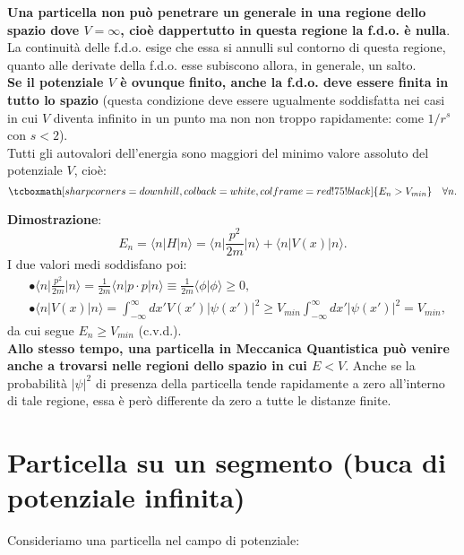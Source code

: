 \documentclass[a4paper,12pt,oneside]{book}
\begin{document}
\textbf{Una particella non può penetrare un generale in una regione dello spazio dove $V =\infty$, cioè dappertutto in questa regione la f.d.o. è nulla}. La continuità delle f.d.o. esige che essa si annulli sul contorno di questa regione, quanto alle derivate della f.d.o. esse subiscono allora, in generale, un salto.\\

\textbf{Se il potenziale $V$ è ovunque finito, anche la f.d.o. deve essere finita in tutto lo spazio} (questa condizione deve essere ugualmente soddisfatta nei casi in cui $V$ diventa infinito in un punto ma non non troppo rapidamente: come $1/r^s$ con $s<2$).\\

Tutti gli autovalori dell'energia sono maggiori del minimo valore assoluto del potenziale $V$, cioè:
	\begin{equation}
		\tcboxmath[sharp corners=downhill, colback=white, colframe=red!75!black]{
			E_n >V_{min} 
			}\quad \forall n.
	\end{equation}
	
\textbf{Dimostrazione}:
	\begin{equation}
		E_n = \langle n \vert H \vert n \rangle =  \langle n \vert \frac{p ^2}{2m} \vert n \rangle + \langle n \vert V(x) \vert n \rangle .
	\end{equation}
I due  valori medi soddisfano poi:
	\begin{align}
		&\bullet \langle n \vert \frac{p ^2}{2m} \vert n \rangle =\frac{1}{2m} \langle n \vert p\cdot p\vert n \rangle \equiv \frac{1}{2m} \langle \phi \vert  \phi \rangle \ge 0 , \\[0.3cm]
		&\bullet \langle n \vert V(x) \vert n \rangle = \int _{-\infty} ^{\infty} dx' V(x') \vert \psi (x') \vert ^2 \geq V_{min} \int _{-\infty} ^{\infty} dx'  \vert \psi (x') \vert ^2 = V_{min} , 
	\end{align}
da cui segue $E_n \geq V_{min}$ (c.v.d.).\\

\textbf{Allo stesso tempo, una particella in Meccanica Quantistica può venire anche a trovarsi nelle regioni dello spazio in cui $E<V$}. Anche se la probabilità $|\psi|^2$ di presenza della particella tende rapidamente a zero all'interno di tale regione, essa è però differente da zero a tutte le distanze finite.
\section{Particella su un segmento (buca di potenziale infinita)}
Consideriamo una particella nel campo di potenziale:\\
\end{document}
